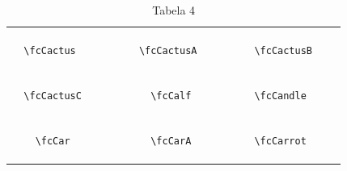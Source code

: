 \documentclass[x11names]{article}
\begin{document}
\begin{table}[H]
\begin{tabular}{|c|c|c|c|c|c|}
		&\multirow{5}{*}{	\fcCactus	[scale=0.16]} & &\multirow{5}{*}{	\fcCactusA	[scale=0.16]} & &\multirow{5}{*}{	\fcCactusB	[scale=0.16]}\\	& & & & & \\	& & & & & \\	\verb|	\fcCactus	| & & \verb|	\fcCactusA	| & & \verb|	\fcCactusB	| & \\	& & & & & \\	& & & & & \\	& & & & & \\	\hline									
		&\multirow{5}{*}{	\fcCactusC	[scale=0.16]} & &\multirow{5}{*}{	\fcCalf	[scale=0.16]} & &\multirow{5}{*}{	\fcCandle	[scale=0.64]}\\	& & & & & \\	& & & & & \\	\verb|	\fcCactusC	| & & \verb|	\fcCalf	| & & \verb|	\fcCandle	| & \\	& & & & & \\	& & & & & \\	& & & & & \\	\hline									
		&\multirow{5}{*}{	\fcCar	[scale=0.64]} & &\multirow{5}{*}{	\fcCarA	[scale=0.16]} & &\multirow{5}{*}{	\fcCarrot	[scale=0.0064]}\\	& & & & & \\	& & & & & \\	\verb|	\fcCar	| & & \verb|	\fcCarA	| & & \verb|	\fcCarrot	| & \\	& & & & & \\	& & & & & \\	& & & & & \\		\hline 	\hline 	\end{tabular}	\caption{	Tabela 4	}\label{	Tab4	}\end{table}
\end{document}

